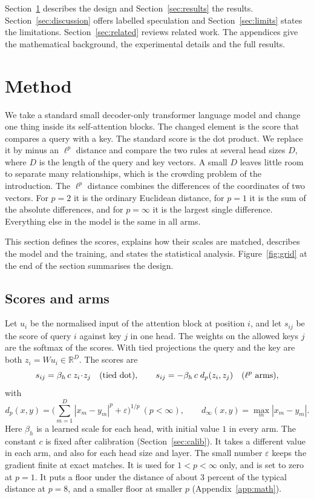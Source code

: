 \documentclass[11pt]{article}
\newcommand{\Lp}{\ensuremath{\ell^p}}
\begin{document}
Section~\ref{sec:method} describes the design and Section~\ref{sec:results} the results.
Section~\ref{sec:discussion} offers labelled speculation and Section~\ref{sec:limits} states the limitations.
Section~\ref{sec:related} reviews related work.
The appendices give the mathematical background, the experimental details and the full results.

\section{Method}\label{sec:method}

We take a standard small decoder-only transformer language model and change one thing inside its self-attention blocks.
The changed element is the score that compares a query with a key.
The standard score is the dot product.
We replace it by minus an $\ell^p$ distance and compare the two rules at several head sizes $D$, where $D$ is the length of the query and key vectors.
A small $D$ leaves little room to separate many relationships, which is the crowding problem of the introduction.
The $\ell^p$ distance combines the differences of the coordinates of two vectors.
For $p=2$ it is the ordinary Euclidean distance, for $p=1$ it is the sum of the absolute differences, and for $p=\infty$ it is the largest single difference.
Everything else in the model is the same in all arms.

This section defines the scores, explains how their scales are matched, describes the model and the training, and states the statistical analysis.
Figure~\ref{fig:grid} at the end of the section summarises the design.

\subsection{Scores and arms}

Let $u_i$ be the normalised input of the attention block at position $i$, and let $s_{ij}$ be the score of query $i$ against key $j$ in one head.
The weights on the allowed keys $j$ are the softmax of the scores.
With tied projections the query and the key are both $z_i=Wu_i\in\mathbb{R}^D$.
The scores are
\begin{equation}
s_{ij}=\beta_h\,c\;z_i\!\cdot\! z_j\quad\text{(tied dot)},\qquad
s_{ij}=-\beta_h\,c\;d_p(z_i,z_j)\quad(\text{\Lp{} arms}),
\end{equation}
with
\begin{equation}
d_p(x,y)=\Big(\sum_{m=1}^{D}|x_m-y_m|^p+\varepsilon\Big)^{1/p}\ (p<\infty),\qquad d_\infty(x,y)=\max_m|x_m-y_m|.
\end{equation}
Here $\beta_h$ is a learned scale for each head, with initial value $1$ in every arm.
The constant $c$ is fixed after calibration (Section~\ref{sec:calib}).
It takes a different value in each arm, and also for each head size and layer.
The small number $\varepsilon$ keeps the gradient finite at exact matches. It is used for $1<p<\infty$ only, and is set to zero at $p=1$.
It puts a floor under the distance of about 3 percent of the typical distance at $p=8$, and a smaller floor at smaller $p$ (Appendix~\ref{app:math}).
\end{document}
